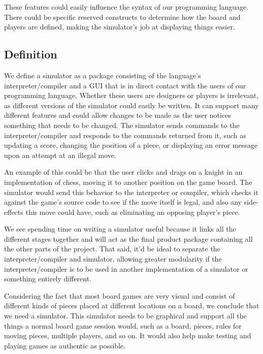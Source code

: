 These features could easily influence the syntax of our programming
language. There could be specific reserved constructs to determine
how the board and players are defined, making the simulator's job at
displaying things easier.

\subsection{Definition} We define a simulator as a package consisting
of the language's interpreter/compiler and a GUI that is in direct
contact with the users of our programming language. Whether these
users are designers or players is irrelevant, as different versions of
the simulator could easily be written. It can support many different
features and could allow changes to be made as the user notices
something that needs to be changed. The simulator sends commands to the
interpreter/compiler and responds to the commands returned from it, such
as updating a score, changing the position of a piece, or displaying an
error message upon an attempt at an illegal move.

An example of this could be that the user clicks and drags on a knight
in an implementation of chess, moving it to another position on the game
board. The simulator would send this behavior to the interpreter or
compiler, which checks it against the game's source code to see if the
move itself is legal, and also any side-effects this move could have,
such as eliminating an opposing player's piece.

We see spending time on writing a simulator useful because it links
all the different stages together and will act as the final product
package containing all the other parts of the project. That said, it'd
be ideal to separate the interpreter/compiler and simulator, allowing
greater modularity if the interpreter/compiler is to be used in another
implementation of a simulator or something entirely different.

Considering the fact that most board games are very visual and consist
of different kinds of pieces placed at different locations on a board,
we conclude that we need a simulator. This simulator needs to be
graphical and support all the things a normal board game session would,
such as a board, pieces, rules for moving pieces, multiple players, and
so on. It would also help make testing and playing games as authentic as
possible.
